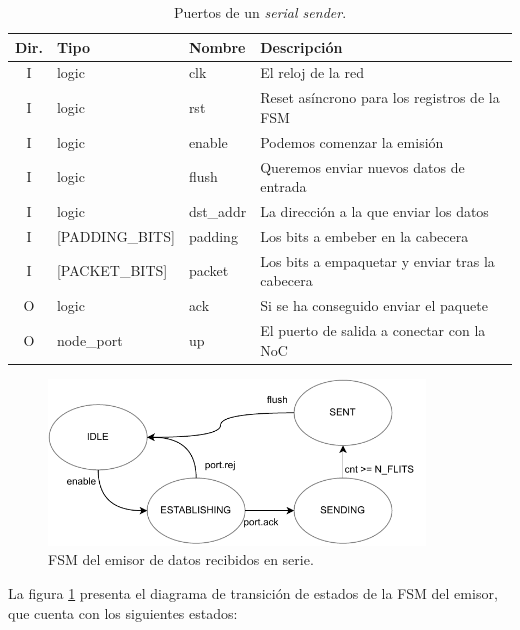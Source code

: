 \begin{table}[h]
    \centering
    \footnotesize
    \begin{tabular}{c|l|l|l}
         \hline
         \textbf{Dir.} & \textbf{Tipo} & \textbf{Nombre} & \textbf{Descripción} \\\hline
         I & logic & clk & El reloj de la red \\
         I & logic & rst & Reset asíncrono para los registros de la FSM \\
         I & logic & enable & Podemos comenzar la emisión \\
         I & logic & flush  & Queremos enviar nuevos datos de entrada \\
         I & logic & dst\_addr & La dirección a la que enviar los datos \\
         I & [PADDING\_BITS] & padding & Los bits a embeber en la cabecera \\
         I & [PACKET\_BITS] & packet & Los bits a empaquetar y enviar tras la cabecera \\
         O & logic   & ack & Si se ha conseguido enviar el paquete \\
         O & node\_port & up & El puerto de salida a conectar con la NoC \\\hline
    \end{tabular}
    \caption{Puertos de un \textit{serial sender}.}
    \label{tab:sender_ports}
\end{table}
\begin{figure}[h]
    \centering
    \includegraphics[width=10cm]{images/diagrams/sender_fsm.drawio.pdf}
    \caption[Máquina de Estados del emisor de datos recibidos en serie.]{FSM del emisor de datos recibidos en serie.}
    \label{fig:sender_fsm}
\end{figure}

La figura \ref{fig:sender_fsm} presenta el diagrama de transición de estados de la FSM del emisor, que cuenta con los siguientes estados:

